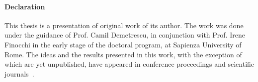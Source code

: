 \paragraph*{Declaration} This thesis is a presentation of original work of its author. The work was done under the guidance of Prof. Camil Demetrescu, in conjunction with Prof. Irene Finocchi in the early stage of the doctoral program, at Sapienza University of Rome. The ideas and the results presented in this work, with the exception of  which are yet unpublished, have appeared in conference proceedings and scientific journals~\cite{Delia11,Delia13,Delia15,Delia16}.

